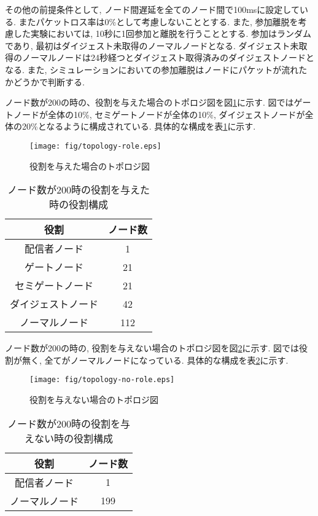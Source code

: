 その他の前提条件として, ノード間遅延を全てのノード間で100msに設定している. またパケットロス率は0\%として考慮しないこととする. また, 参加離脱を考慮した実験においては, 10秒に1回参加と離脱を行うこととする. 参加はランダムであり, 最初はダイジェスト未取得のノーマルノードとなる. ダイジェスト未取得のノーマルノードは24秒経つとダイジェスト取得済みのダイジェストノードとなる. また, シミュレーションにおいての参加離脱はノードにパケットが流れたかどうかで判断する.

ノード数が200の時の、役割を与えた場合のトポロジ図を図\ref{fig:topology-role}に示す. 図ではゲートノードが全体の10\%, セミゲートノードが全体の10\%, ダイジェストノードが全体の20\%となるように構成されている. 具体的な構成を表\ref{tbl:topology-ex}に示す.

\begin{figure}[h]
  \centering
  \texttt{[image: fig/topology-role.eps]}
  \caption{役割を与えた場合のトポロジ図}
  \label{fig:topology-role}
\end{figure}

\newpage

\begin{table}[h]
  \caption{ノード数が200時の役割を与えた時の役割構成}
  \label{tbl:topology-ex}
  \centering
      {\small
        \begin{tabular}{|c|c|} \hline
        役割 & ノード数 \\ \hline \hline
        配信者ノード & 1 \\ \hline
        ゲートノード & 21 \\ \hline
        セミゲートノード & 21 \\ \hline
        ダイジェストノード & 42 \\ \hline
        ノーマルノード & 112 \\ \hline
        \end{tabular}
      }
\end{table}

ノード数が200の時の, 役割を与えない場合のトポロジ図を図\ref{fig:topology-no-role}に示す. 図では役割が無く, 全てがノーマルノードになっている. 具体的な構成を表\ref{tbl:topology-ex-no-role}に示す.

\newpage

\begin{figure}[h]
  \centering
  \texttt{[image: fig/topology-no-role.eps]}
  \caption{役割を与えない場合のトポロジ図}
  \label{fig:topology-no-role}
\end{figure}

\begin{table}[h]
  \caption{ノード数が200時の役割を与えない時の役割構成}
  \label{tbl:topology-ex-no-role}
  \centering
      {\small
        \begin{tabular}{|c|c|} \hline
        役割 & ノード数 \\ \hline \hline
        配信者ノード & 1 \\ \hline
        ノーマルノード & 199 \\ \hline
        \end{tabular}
      }
\end{table}

